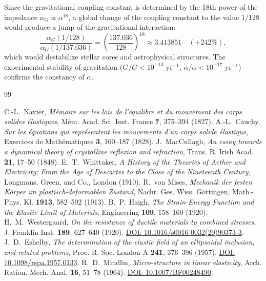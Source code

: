\documentclass[11pt,a4paper]{article}
\theoremstyle{definition}
\theoremstyle{remark}
\begin{document}
Since the gravitational coupling constant is determined by the 18th power of the impedance $\alpha_G \propto \alpha^{18}$, a global change of the coupling constant to the value $1/128$ would produce a jump of the gravitational interaction:
\begin{equation}
	\frac{\alpha_G(1/128)}{\alpha_G(1/137.036)} = \left(\frac{137.036}{128}\right)^{18} \approx 3.413851 \quad (+242\%),
	\label{eq:renorm_jump_catastrophe}
\end{equation}
which would destabilize stellar cores and astrophysical structures. The experimental stability of gravitation ($\dot{G}/G < 10^{-13}\text{ yr}^{-1}$, $\dot{\alpha}/\alpha < 10^{-17}\text{ yr}^{-1}$) confirms the constancy of $\alpha$.

\begin{thebibliography}{99}
	
	 C.-L.~Navier, \textit{M{\'e}moire sur les lois de l'{\'e}quilibre et du mouvement des corps solides {\'e}lastiques}, M{\'e}m. Acad. Sci. Inst. France \textbf{7}, 375--394 (1827).
	 A.-L.~Cauchy, \textit{Sur les {\'e}quations qui repr{\'e}sentent les mouvements d'un corps solide {\'e}lastique}, Exercices de Math{\'e}matiques \textbf{3}, 160--187 (1828).
	 J.~MacCullagh, \textit{An essay towards a dynamical theory of crystalline reflexion and refraction}, Trans. R. Irish Acad. \textbf{21}, 17--50 (1848).
	 E.~T.~Whittaker, \textit{A History of the Theories of Aether and Electricity: From the Age of Descartes to the Close of the Nineteenth Century}, Longmans, Green, and Co., London (1910).
	 R.~von Mises, \textit{Mechanik der festen K{\"o}rper im plastisch-deformablen Zustand}, Nachr. Ges. Wiss. G{\"o}ttingen, Math.-Phys. Kl. \textbf{1913}, 582--592 (1913).
	 B.~P.~Haigh, \textit{The Strain-Energy Function and the Elastic Limit of Materials}, Engineering \textbf{109}, 158--160 (1920).
	 H.~M.~Westergaard, \textit{On the resistance of ductile materials to combined stresses}, J. Franklin Inst. \textbf{189}, 627--640 (1920). \href{https://doi.org/10.1016/s0016-0032(20)90373-3}{DOI: 10.1016/s0016-0032(20)90373-3}.
	 J.~D.~Eshelby, \textit{The determination of the elastic field of an ellipsoidal inclusion, and related problems}, Proc. R. Soc. London A \textbf{241}, 376--396 (1957). \href{https://doi.org/10.1098/rspa.1957.0133}{DOI: 10.1098/rspa.1957.0133}.
	 R.~D.~Mindlin, \textit{Micro-structure in linear elasticity}, Arch. Ration. Mech. Anal. \textbf{16}, 51--78 (1964). \href{https://doi.org/10.1007/BF00248490}{DOI: 10.1007/BF00248490}.
	

\end{thebibliography}
\end{document}

